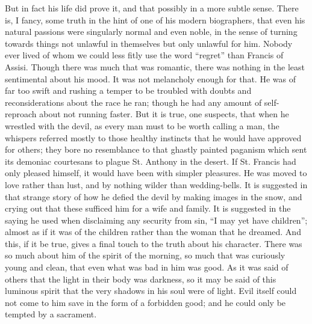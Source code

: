 \documentclass{book}
\begin{document}
But in fact his life did prove it, and that possibly in a more subtle sense. There is, I fancy, some truth in the hint of one of his modern biographers, that even his natural passions were singularly normal and even noble, in the sense of turning towards things not unlawful in themselves but only unlawful for him. Nobody ever lived of whom we could less fitly use the word “regret” than Francis of Assisi. Though there was much that was romantic, there was nothing in the least sentimental about his mood. It was not melancholy enough for that. He was of far too swift and rushing a temper to be troubled with doubts and reconsiderations about the race he ran; though he had any amount of self-reproach about not running faster. But it is true, one suspects, that when he wrestled with the devil, as every man must to be worth calling a man, the whispers referred mostly to those healthy instincts that he would have approved for others; they bore no resemblance to that ghastly painted paganism which sent its demoniac courtesans to plague St. Anthony in the desert. If St. Francis had only pleased himself, it would have been with simpler pleasures. He was moved to love rather than lust, and by nothing wilder than wedding-bells. It is suggested in that strange story of how he defied the devil by making images in the snow, and crying out that these sufficed him for a wife and family. It is suggested in the saying he used when disclaiming any security from sin, “I may yet have children”; almost as if it was of the children rather than the woman that he dreamed. And this, if it be true, gives a final touch to the truth about his character. There was so much about him of the spirit of the morning, so much that was curiously young and clean, that even what was bad in him was good. As it was said of others that the light in their body was darkness, so it may be said of this luminous spirit that the very shadows in his soul were of light. Evil itself could not come to him save in the form of a forbidden good; and he could only be tempted by a sacrament.
\end{document}

